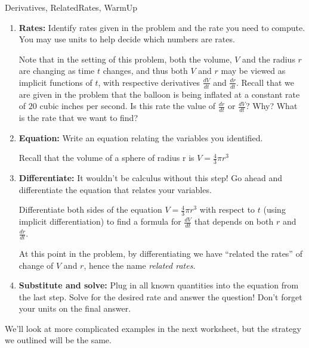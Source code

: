 \begin{tagblock}{Derivatives, RelatedRates, WarmUp}
\begin{question}
\begin{enumerate}
\item {\bf Rates:} Identify rates given in the problem and the rate you need to compute. You may use units to help decide which numbers are rates.\\

\smallskip

Note that in the setting of this problem, both the volume, $V$ and the radius $r$ are changing as time $t$ changes, and thus both $V$ and $r$ may be viewed as implicit functions of $t$, with respective derivatives $\frac{dV}{dt}$ and $\frac{dr}{dt}$.  Recall that we are given in the problem that the balloon is being inflated at a constant rate of $20$ cubic inches per second. Is this rate the value of $\frac{dr}{dt}$ or $\frac{dV}{dt}$? Why?  What is the rate that we want to find?  

\vspace{1in}

\item {\bf Equation:} Write an equation relating the variables you identified. \\

\smallskip

Recall that the volume of a sphere of radius r is   $V=\frac{4}{3} \pi r^3$

\vspace{.5in}

\item {\bf Differentiate:} It wouldn't be calculus without this step! Go ahead and differentiate the equation that relates your variables.


Differentiate both sides of the equation $V=\frac{4}{3} \pi r^3$ with respect to $t$ (using implicit differentiation) to find a formula for $\frac{dV}{dt}$ that depends on both $r$ and $\frac{dr}{dt}$.

\vspace{2in}

At this point in the problem, by differentiating we have ``related the rates'' of change of $V$ and $r$, hence the name \emph{related rates}.   

\item {\bf Substitute and solve:} Plug in all known quantities into the equation from the last step. Solve for the desired rate and answer the question!  Don't forget your units on the final answer.  


\end{enumerate}
\vspace{3in}
We'll look at more complicated examples in the next worksheet, but the strategy we outlined will be the same.  




\end{question}
\end{tagblock}
